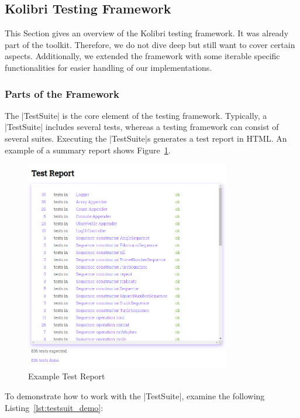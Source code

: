 \subsection{Kolibri Testing Framework}
\label{sub:Kolibri Test Framework}
This Section gives an overview of the Kolibri testing framework. It was already
part of the toolkit. Therefore, we do not dive deep but still want to cover
certain aspects. Additionally, we extended the framework with some iterable
specific functionalities for easier handling of our implementations.

\subsubsection{Parts of the Framework}
\label{subsub:Parts of the Framework}
The |TestSuite| is the core element of the testing framework. Typically, a
|TestSuite| includes several tests, whereas a testing framework can consist of
several suites. Executing the |TestSuite|s generates a test report in HTML.
An example of a summary report shows Figure~\ref{fig:test_report}.

\begin{figure}[H]
    \centering
    \includegraphics[width=0.8\textwidth]{mainmatter/pictures/test_report.png}
    \caption{Example Test Report}
    \label{fig:test_report}
\end{figure}


To demonstrate how to work with the |TestSuite|, examine the following
Listing~\ref{lst:testsuit_demo}:

